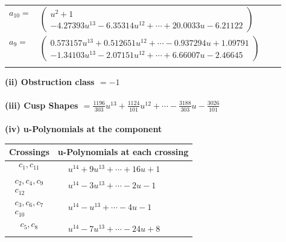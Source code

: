 \documentclass[1p]{elsarticle_modified}
\theoremstyle{definition}
\begin{document}
\begin{tabular}{m{7pt} m{180pt} m{7pt} m{180pt} }
\flushright $a_{10}=$&$\begin{pmatrix}u^2+1\\-4.27393 u^{13}-6.35314 u^{12}+\cdots+20.0033 u-6.21122\end{pmatrix}$ \\
\flushright $a_{9}=$&$\begin{pmatrix}0.573157 u^{13}+0.512651 u^{12}+\cdots-0.937294 u+1.09791\\-1.34103 u^{13}-2.07151 u^{12}+\cdots+6.66007 u-2.46645\end{pmatrix}$\\&\end{tabular}
\flushleft \textbf{(ii) Obstruction class $= -1$}\\~\\
\flushleft \textbf{(iii) Cusp Shapes $= \frac{1196}{303} u^{13}+\frac{1124}{101} u^{12}+\cdots-\frac{3188}{303} u-\frac{3026}{101}$}\\~\\
\newpage\renewcommand{\arraystretch}{1}
\flushleft \textbf{(iv) u-Polynomials at the component}\newline \\
\begin{tabular}{m{50pt}|m{274pt}}
Crossings & \hspace{64pt}u-Polynomials at each crossing \\
\hline $$\begin{aligned}c_{1},c_{11}\end{aligned}$$&$\begin{aligned}
&u^{14}+9 u^{13}+\cdots+16 u+1
\end{aligned}$\\
\hline $$\begin{aligned}c_{2},c_{4},c_{9}\\c_{12}\end{aligned}$$&$\begin{aligned}
&u^{14}-3 u^{13}+\cdots-2 u-1
\end{aligned}$\\
\hline $$\begin{aligned}c_{3},c_{6},c_{7}\\c_{10}\end{aligned}$$&$\begin{aligned}
&u^{14}- u^{13}+\cdots-4 u-1
\end{aligned}$\\
\hline $$\begin{aligned}c_{5},c_{8}\end{aligned}$$&$\begin{aligned}
&u^{14}-7 u^{13}+\cdots-24 u+8
\end{aligned}$\\
\hline
\end{tabular}\\~\\
\end{document}
